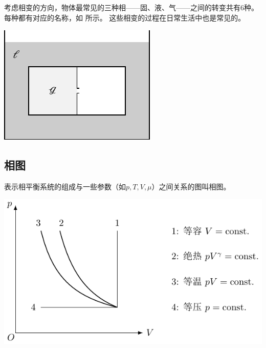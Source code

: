 考虑相变的方向，物体最常见的三种相——固、液、气——之间的转变共有6种。每种都有对应的名称，如 所示。
这些相变的过程在日常生活中也是常见的。

\begin{center}
	\includegraphics[page=6]{figures/tikz/layouts.pdf}
	\label{fig:phase transition}
\end{center}

\subsection{相图}
\label{ssec:phase graph}

表示相平衡系统的组成与一些参数（如$p,T,V,\mu$）之间关系的图叫相图。

\begin{center}
	\includegraphics[page=8]{figures/tikz/coordinates.pdf}
	\label{fig:H2O phase P-T-V}
\end{center}

